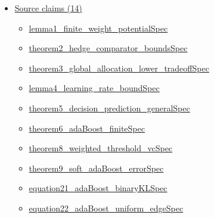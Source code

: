 \documentclass[10pt]{article}
\begin{document}
\begin{itemize}[leftmargin=1.2em]
\begin{itemize}[leftmargin=1.2em]
\item \hyperlink{library-prerequisite-d910405064240e75}{Applied\allowbreak{}Modeling\allowbreak{}Lib.\allowbreak{}Learning.\allowbreak{}Online.\allowbreak{}hedge\allowbreak{}Weight\allowbreak{}State\allowbreak{}Cumulative\allowbreak{}Loss}
\item \hyperlink{library-prerequisite-ec888a887d36d73d}{Applied\allowbreak{}Modeling\allowbreak{}Lib.\allowbreak{}Learning.\allowbreak{}Online.\allowbreak{}hedge\allowbreak{}Weight\allowbreak{}State\allowbreak{}Run}
\end{itemize}
\item \hyperlink{source-section-f10b5f68e4acf3dc}{Source claims (14)}
\begin{itemize}[leftmargin=1.2em]
\item \hyperlink{source-claim-04236902ceef3985}{lemma1\_\allowbreak{}finite\_\allowbreak{}weight\_\allowbreak{}potential\allowbreak{}Spec}
\item \hyperlink{source-claim-8367231b424fe052}{theorem2\_\allowbreak{}hedge\_\allowbreak{}comparator\_\allowbreak{}bounds\allowbreak{}Spec}
\item \hyperlink{source-claim-9d8bdc89a086e8c4}{theorem3\_\allowbreak{}global\_\allowbreak{}allocation\_\allowbreak{}lower\_\allowbreak{}tradeoff\allowbreak{}Spec}
\item \hyperlink{source-claim-c391b7320b97c0f7}{lemma4\_\allowbreak{}learning\_\allowbreak{}rate\_\allowbreak{}bound\allowbreak{}Spec}
\item \hyperlink{source-claim-479f3689a1324594}{theorem5\_\allowbreak{}decision\_\allowbreak{}prediction\_\allowbreak{}general\allowbreak{}Spec}
\item \hyperlink{source-claim-4636471b1f8c8e3c}{theorem6\_\allowbreak{}ada\allowbreak{}Boost\_\allowbreak{}finite\allowbreak{}Spec}
\item \hyperlink{source-claim-7a8193a4706926bf}{theorem8\_\allowbreak{}weighted\_\allowbreak{}threshold\_\allowbreak{}vc\allowbreak{}Spec}
\item \hyperlink{source-claim-a54b1bc46151ef0b}{theorem9\_\allowbreak{}soft\_\allowbreak{}ada\allowbreak{}Boost\_\allowbreak{}error\allowbreak{}Spec}
\item \hyperlink{source-claim-e590fab8ff890880}{equation21\_\allowbreak{}ada\allowbreak{}Boost\_\allowbreak{}binary\allowbreak{}KL\allowbreak{}Spec}
\item \hyperlink{source-claim-93191e6553024dae}{equation22\_\allowbreak{}ada\allowbreak{}Boost\_\allowbreak{}uniform\_\allowbreak{}edge\allowbreak{}Spec}

\end{itemize}
\end{itemize}
\end{document}
